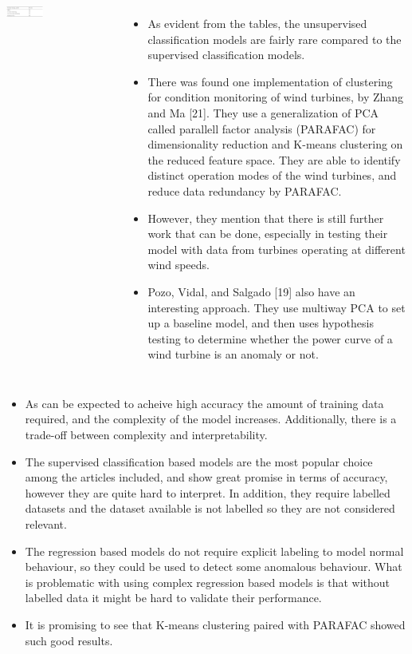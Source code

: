 \documentclass[18pt, a3paper, portrait]{tikzposter}
\begin{document}
\begin{columns}
    {
        \begin{tikzfigure}
            \includegraphics[width=0.35\textwidth]{images/unsupervised_clas_based_models_table.png}
        \end{tikzfigure}
    }
 
    {
        \begin{itemize}
            \item As evident from the tables, the unsupervised classification models are fairly rare compared to the supervised classification models. 
            \item There was found one implementation of clustering for condition monitoring of wind turbines, by Zhang and Ma [21]. 
                They use a generalization of PCA called parallell factor analysis (PARAFAC) for dimensionality reduction and K-means clustering on the reduced feature space.
                They are able to identify distinct operation modes of the wind turbines, and reduce data redundancy by PARAFAC. 
            \item However, they mention that there is still further work that can be done, especially in testing their model with data from turbines operating
                at different wind speeds.
            \item Pozo, Vidal, and Salgado [19] also have an interesting approach. They use multiway
                PCA to set up a baseline model, and then uses hypothesis testing to determine whether the
                power curve of a wind turbine is an anomaly or not.
        \end{itemize}
    }
\end{columns}

{
    \begin{itemize}
        \item As can be expected to acheive high accuracy the amount of training data required, and the complexity of the model increases. Additionally, there is a trade-off between complexity and interpretability.
        \item The supervised classification based models are the most popular choice among the articles included, and show great promise in terms of accuracy, however they are quite hard to interpret. In addition, they require labelled datasets and the dataset available is not labelled so they are not considered relevant.
        \item The regression based models do not require explicit labeling to model normal behaviour, so they could be used to detect some anomalous behaviour. What is problematic with using complex regression based models is that without labelled data it might be hard to validate their performance.
        \item It is promising to see that K-means clustering paired with PARAFAC showed such good results.
    \end{itemize}
}
\end{document}
